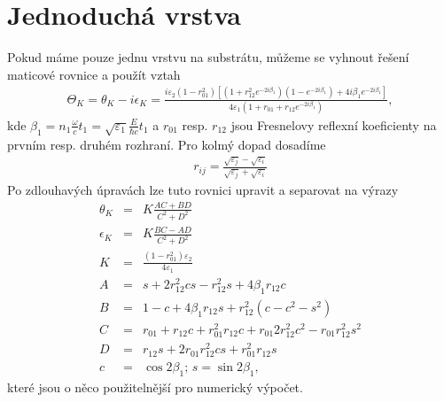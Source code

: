\section{Jednoduchá vrstva}
Pokud máme pouze jednu vrstvu na substrátu, můžeme se vyhnout řešení maticové rovnice a použít vztah
\begin{eqnarray}
\Theta_K=\theta_K-i\epsilon_K=\frac{i\varepsilon_2(1-r^2_{01})\left[(1+r^2_{12}e^{-2i\beta_1})(1-e^{-2i\beta_1})+4i\beta_1e^{-2i\beta_1}\right]}{4\varepsilon_1(1+r_{01}+r_{12}e^{-2i\beta_1})},
\label{teor kerr}
\end{eqnarray}
kde $\beta_1=n_1\frac{\omega}{c}t_1=\sqrt{\varepsilon_1}\frac{E}{\hbar c}t_1$ a $r_{01}$ resp. $r_{12}$ jsou Fresnelovy reflexní koeficienty na prvním resp. druhém rozhraní. Pro kolmý dopad dosadíme
\begin{eqnarray}
r_{ij}=\frac{\sqrt{\varepsilon_j}-\sqrt{\varepsilon_i}}{\sqrt{\varepsilon_j}+\sqrt{\varepsilon_i}}
\end{eqnarray}
Po zdlouhavých úpravách lze tuto rovnici upravit a separovat na výrazy
\begin{eqnarray}
\theta_K&=&K\frac{AC+BD}{C^2+D^2}\\
\epsilon_K&=&K\frac{BC-AD}{C^2+D^2} \\
K&=&\frac{(1-r_{01}^2)\varepsilon_2}{4\varepsilon_1} \\
A&=&s+2r_{12}^2cs-r^2_{12}s+4\beta_1r_{12}c \\
B&=&1-c+4\beta_1r_{12}s+r^2_{12}(c-c^2-s^2) \\
C&=&r_{01}+r_{12}c+r_{01}^2r_{12}c+r_{01}2r_{12}^2c^2-r_{01}r_{12}^2s^2 \\
D&=&r_{12}s+2r_{01}r_{12}^2cs+r_{01}^2r_{12}s \\
c&=&\cos 2\beta_1;\, s=\sin 2\beta_1,
\end{eqnarray}
které jsou o něco použitelnější pro numerický výpočet.
